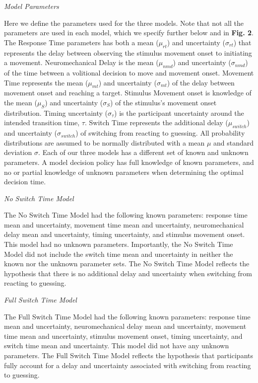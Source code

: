 \documentclass[12pt]{article}
\newcommand\boldblue[1]{\textcolor{mydarkblue}{\textbf{#1}}}
\begin{document}
\vspace{2mm}
\noindent \emph{Model Parameters}

\noindent Here we define the parameters used for the three models. Note that not all the parameters are used in each model, which we specify further below and in \boldblue{Fig. 2}. The Response Time parameters has both a mean ($\mu_{rt}$) and uncertainty ($\sigma_{rt}$) that represents the delay between observing the stimulus movement onset to initiating a movement. Neuromechanical Delay is the mean ($\mu_{nmd}$) and uncertainty ($\sigma_{nmd}$) of the time between a volitional decision to move and movement onset. Movement Time represents the mean ($\mu_{mt}$) and uncertainty ($\sigma_{mt}$) of the delay between movement onset and reaching a target. Stimulus Movement onset is knowledge of the mean ($\mu_{S}$) and uncertainty ($\sigma_{S}$) of the stimulus’s movement onset distribution. Timing uncertainty ($\sigma_{\tau}$) is the participant uncertainty around the intended transition time, $\tau$. Switch Time represents the additional delay ($\mu_{switch}$) and uncertainty  ($\sigma_{switch}$) of switching from reacting to guessing. All probability distributions are assumed to be normally distributed with a mean $\mu$ and standard deviation $\sigma$.  Each of our three models has a different set of known and unknown parameters. A model decision policy has full knowledge of known parameters, and no or partial knowledge of unknown parameters when determining the optimal decision time.

\vspace{2mm}
\noindent \emph{No Switch Time Model}

\noindent The No Switch Time Model had the following known parameters: response time mean and uncertainty, movement time mean and uncertainty, neuromechanical delay mean and uncertainty, timing uncertainty, and stimulus movement onset. This model had no unknown parameters. Importantly, the No Switch Time Model did not include the switch time mean and uncertainty in neither the known nor the unknown parameter sets. The No Switch Time Model reflects the hypothesis that there is no additional delay and uncertainty when switching from reacting to guessing.

\vspace*{2mm}
\noindent \emph{Full Switch Time Model}

\noindent The Full Switch Time Model had the following known parameters: response time mean and uncertainty, neuromechanical delay mean and uncertainty, movement time mean and uncertainty, stimulus movement onset, timing uncertainty, and switch time mean and uncertainty. This model did not have any unknown parameters. The Full Switch Time Model reflects the hypothesis that participants fully account for a delay and uncertainty associated with switching from reacting to guessing.
\end{document}

